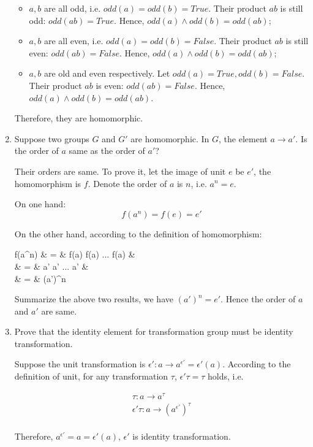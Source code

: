 \documentclass[UTF8]{article}
\begin{document}
\begin{enumerate}
  \begin{itemize}
  \item $a, b$ are all odd, i.e. $odd(a) = odd(b) = True$. Their product $ab$ is still odd: $odd(ab) = True$. Hence, $odd(a) \land odd(b) = odd(ab)$;
  \item $a, b$ are all even, i.e. $odd(a) = odd(b) = False$. Their product $ab$ is still even: $odd(ab) = False$. Hence, $odd(a) \land odd(b) = odd(ab)$;
  \item $a, b$ are old and even respectively. Let $odd(a) = True, odd(b) = False$. Their product $ab$ is even: $odd(ab) = False$. Hence, $odd(a) \land odd(b) = odd(ab)$.
  \end{itemize}

Therefore, they are homomorphic.

\item {Suppose two groups $G$ and $G'$ are homomorphic. In $G$, the element $a \to a'$. Is the order of $a$ same as the order of $a'$?}

Their orders are same. To prove it, let the image of unit $e$ be $e'$, the homomorphism is $f$. Denote the order of $a$ is $n$, i.e. $a^n = e$.

On one hand:
\[
f(a^n) = f(e) = e'
\]

On the other hand, according to the definition of homomorphism:

\bre
f(a^n) & = & f(a) f(a) ... f(a) &  \\
  & = & a' a' ... a' &  \\
  & = & (a')^n
\ere

Summarize the above two results, we have $(a')^n = e'$. Hence the order of $a$ and $a'$ are same.

\item {Prove that the identity element for transformation group must be identity transformation.}

Suppose the unit transformation is $\epsilon': a \to a^{\epsilon'} = \epsilon'(a)$. According to the definition of unit, for any transformation $\tau$, $\epsilon' \tau = \tau$ holds, i.e.

\[
\begin{array}{l}
\tau: a \to a^\tau \\
\epsilon' \tau: a \to (a^{\epsilon'})^\tau \\
\end{array}
\]

Therefore, $a^{\epsilon'} = a = \epsilon'(a)$, $\epsilon'$ is identity transformation.


\end{enumerate}
\end{document}
